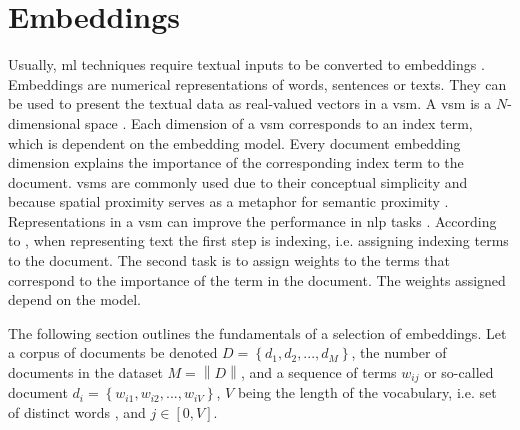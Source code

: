 \section{Embeddings}\label{sec:embeddings}

Usually, \ac{ml} techniques require textual inputs to be converted to embeddings \cite{SentRep2014}.
Embeddings are numerical representations of words, sentences or texts.
They can be used to present the textual data as real-valued vectors in a \ac{vsm}.
A \ac{vsm} is a $N$-dimensional space \cite{soft_cosine2014}.
Each dimension of a \ac{vsm} corresponds to an index term, which is dependent on the embedding model.
Every document embedding dimension explains the importance of the corresponding index term to the document.
\acp{vsm} are commonly used due to their conceptual simplicity and because spatial proximity serves as a metaphor for semantic proximity 
\cite{tfidf2008, UniversalSentEnc2018, HfsentTrans2019, Top2Vec2020}.
Representations in a \ac{vsm} can improve the performance in \ac{nlp} tasks \cite{SkipGram2013}.
According to \citeauthor{tfidf2008}, when representing text the first step is indexing, i.e. assigning indexing terms to the document.
The second task is to assign weights to the terms that correspond to the importance of the term in the document.
The weights assigned depend on the model.

The following section outlines the fundamentals of a selection of embeddings.
Let a corpus of documents be denoted $D= \left\{d_1, d_2, ..., d_M  \right\}$, 
the number of documents in the dataset $M = \left\| D \right\|$,
and a sequence of terms $w_{ij}$ or so-called document $d_i = \left\{w_{i1}, w_{i2}, ..., w_{iV}  \right\}$, 
$V$ being the length of the vocabulary, 
i.e. set of distinct words \cite{clusteringDocs2020}, and $j \in [0, V]$.










